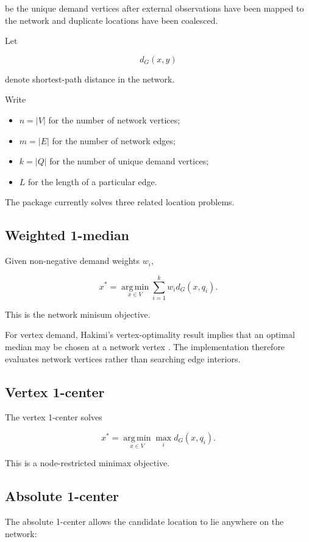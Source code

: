 \documentclass[11pt]{article}
\newcommand{\argmin}{\operatorname*{arg\,min}}
\begin{document}
be the unique demand vertices after external observations have been mapped to
the network and duplicate locations have been coalesced.

Let

\[
d_G(x,y)
\]

denote shortest-path distance in the network.

Write

\begin{itemize}[leftmargin=1.5em]
\item \(n=|V|\) for the number of network vertices;
\item \(m=|E|\) for the number of network edges;
\item \(k=|Q|\) for the number of unique demand vertices;
\item \(L\) for the length of a particular edge.
\end{itemize}

The package currently solves three related location problems.

\subsection{Weighted 1-median}

Given non-negative demand weights \(w_i\),

\[
x^*
=
\argmin_{x\in V}
\sum_{i=1}^{k}
w_i d_G(x,q_i).
\]

This is the network minisum objective.

For vertex demand, Hakimi's vertex-optimality result implies that an optimal
median may be chosen at a network vertex \cite{Hakimi1964}. The implementation
therefore evaluates network vertices rather than searching edge interiors.

\subsection{Vertex 1-center}

The vertex 1-center solves

\[
x^*
=
\argmin_{x\in V}
\max_i d_G(x,q_i).
\]

This is a node-restricted minimax objective.

\subsection{Absolute 1-center}

The absolute 1-center allows the candidate location to lie anywhere on the
network:
\end{document}
